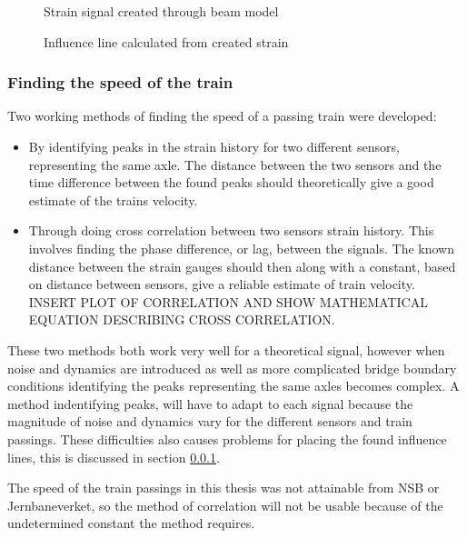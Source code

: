 \begin{figure}[H]
	\begin{adjustbox}{center}
		
	\end{adjustbox}
	\caption{Strain signal created through beam model}
	\label{fig:strainCreated}
\end{figure}
\begin{figure}[H]
	\begin{adjustbox}{center}
		
	\end{adjustbox}
	\caption{Influence line calculated from created strain}
	\label{fig:inflCreated}
\end{figure}


\subsubsection{Finding the speed of the train}
Two working methods of finding the speed of a passing train were developed:
\begin{itemize}
 \item By identifying peaks in the strain history for two different sensors, representing the same axle. The distance between the two sensors and the time difference between the found peaks should theoretically give a good estimate of the trains velocity.
 \item Through doing cross correlation between two sensors strain history. This involves finding the phase difference, or lag, between the signals. The known distance between the strain gauges should then along with a constant, based on distance between sensors, give a reliable estimate of train velocity. INSERT PLOT OF CORRELATION AND SHOW MATHEMATICAL EQUATION DESCRIBING CROSS CORRELATION.
\end{itemize}
These two methods both work very well for a theoretical signal, however when noise and dynamics are introduced as well as more complicated bridge boundary conditions identifying the peaks representing the same axles becomes complex. A method indentifying peaks, will have to adapt to each signal because the magnitude of noise and dynamics vary for the different sensors and train passings. These difficulties also causes problems for placing the found influence lines, this is discussed in section \ref{}.

The speed of the train passings in this thesis was not attainable from NSB or Jernbaneverket, so the method of correlation will not be usable because of the undetermined constant the method requires.


